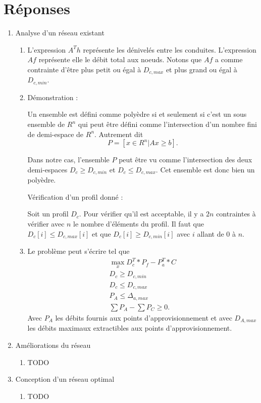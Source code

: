 \documentclass[french]{article}
\begin{document}
\section{Réponses}
\begin{enumerate}
	\item Analyse d'un réseau existant
	\begin{enumerate}[label=\theenumi.\arabic*]
		\item 
			L'expression $A^T h$ représente les dénivelés entre les conduites.
			L'expression $Af$ représente elle le débit total aux noeuds.
			Notons que $Af$ a comme contrainte d'être plus petit ou égal à $D_{c,max}$ et plus grand ou égal à $D_{c,min}$.
		\item 
			Démonstration :
			
			Un ensemble est défini comme polyèdre si et seulement si c'est un sous ensemble de $R^n$ qui peut être défini comme l'intersection d'un nombre fini de demi-espace de $R^n$. Autrement dit $$P=\left[x \in R^n |Ax\geq b\right].$$
			
			Dans notre cas, l'ensemble $P$ peut être vu comme l'intersection des deux demi-espaces $D_c\geq D_{c,min}$ et $D_c\leq D_{c,max}$.
			Cet ensemble est donc bien un polyèdre.
			
			Vérification d'un profil donné :
			
			Soit un profil $D_c$.
			Pour vérifier qu'il est acceptable, il y a $2n$ contraintes à vérifier avec $n$ le nombre d'éléments du profil.
			Il faut que $D_c[i]\leq D_{c,max}[i]$ et que $D_c[i]\geq D_{c,min}[i]$ avec $i$ allant de $0$ à $n$.
		\item 
			Le problème peut s'écrire tel que
			\begin{align*}
				\max_x D_c^T*P_f - P_a^T * C\\
				D_c\geq D_{c,min}\\
				D_c\leq D_{c,max}\\
				P_A\leq \Delta_{a,max}\\
				\sum P_A - \sum P_C \geq 0.
			\end{align*}
			Avec $P_A$ les débits fournis aux points d'approvisionnement et avec $D_{A,max}$ les débits maximaux extractibles aux points d'approvisionnement.
	\end{enumerate}

	\item Améliorations du réseau
	\begin{enumerate}[label=\theenumi.\arabic*]
		\item TODO
	\end{enumerate}
	\item Conception d'un réseau optimal
	\begin{enumerate}[label=\theenumi.\arabic*]
		\item TODO
	\end{enumerate}
\end{enumerate}
\end{document}
